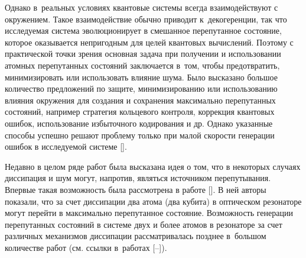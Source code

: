 Однако в~реальных условиях квантовые системы всегда взаимодействуют с окружением. Такое взаимодействие обычно приводит к~декогеренции, так что исследуемая система эволюционирует в смешанное перепутанное состояние, которое оказывается непригодным для целей квантовых вычислений. Поэтому с практической точки зрения основная задача при получении и  использовании атомных перепутанных состояний заключается в~том, чтобы предотвратить, минимизировать или  использовать влияние шума. Было высказано большое количество  предложений по защите, минимизированию или использованию влияния окружения для создания и сохранения  максимально перепутанных состояний, например стратегия кольцевого контроля, коррекция квантовых ошибок, использование избыточного кодирования и др. Однако указанные способы успешно решают проблему только при малой скорости генерации ошибок в исследуемой системе [].



Недавно в целом ряде работ была высказана  идея о том, что в  некоторых случаях диссипация и шум могут, напротив, являться источником перепутывания. Впервые такая возможность была рассмотрена в работе  []. В ней авторы показали,  что за счет диссипации   два атома (два кубита) в оптическом резонаторе могут перейти в максимально перепутанное состояние. Возможность генерации перепутанных состояний в системе двух и более атомов в резонаторе за счет различных механизмов диссипации рассматривалась  позднее в~большом количестве работ (см.  ссылки в~работах [--]).



